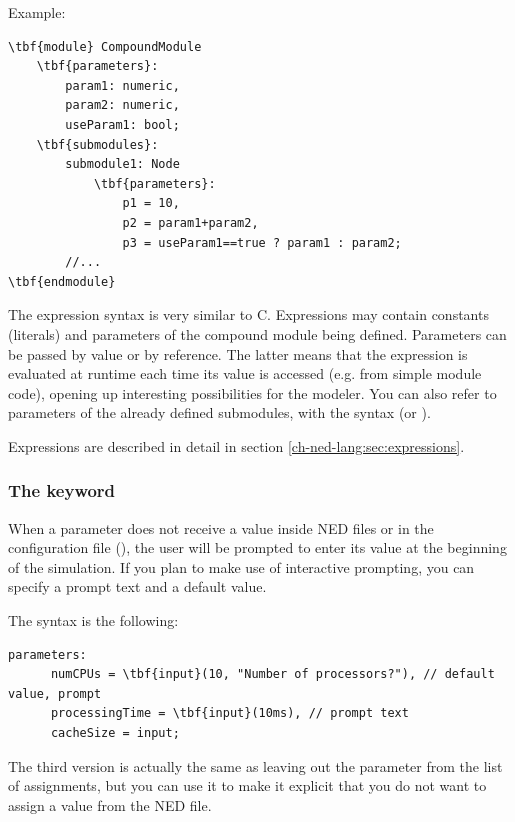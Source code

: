 Example:

\begin{Verbatim}[commandchars=\\\{\}]
\tbf{module} CompoundModule
    \tbf{parameters}:
        param1: numeric,
        param2: numeric,
        useParam1: bool;
    \tbf{submodules}:
        submodule1: Node
            \tbf{parameters}:
                p1 = 10,
                p2 = param1+param2,
                p3 = useParam1==true ? param1 : param2;
        //...
\tbf{endmodule}
\end{Verbatim}


The expression syntax  is very similar to C.
Expressions may contain constants (literals) and parameters of the
compound module being defined. Parameters can be passed by value
or by reference. The latter means that the expression is evaluated
at runtime each time its value is accessed (e.g. from simple module
code), opening up interesting possibilities for the modeler.
You can also refer to parameters of the already defined submodules,
with the syntax 
(or ).

Expressions are described in detail in section \ref{ch-ned-lang:sec:expressions}.


\subsubsection{The  keyword}
\label{sec:ch-ned-lang:input}

When a parameter does not receive a value inside NED files or in
the configuration file (), the user will be prompted
to enter its value at the beginning of the simulation.
If you plan to make use of interactive prompting, you can specify
a prompt text and a default value.

The syntax is the following:

\begin{Verbatim}[commandchars=\\\{\}]
   parameters:
      numCPUs = \tbf{input}(10, "Number of processors?"), // default value, prompt
      processingTime = \tbf{input}(10ms), // prompt text
      cacheSize = input;
\end{Verbatim}

The third version is actually the same as leaving out the parameter
from the list of assignments, but you can use it to make it explicit
that you do not want to assign a value from the NED file.


